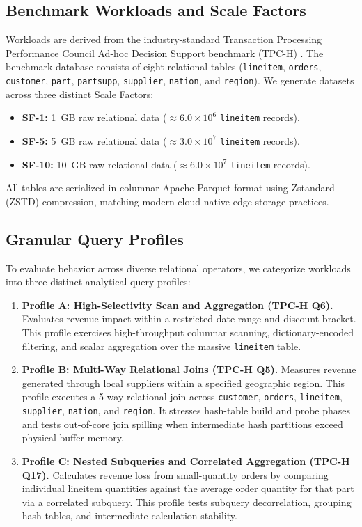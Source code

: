 \subsection{Benchmark Workloads and Scale Factors}
Workloads are derived from the industry-standard Transaction Processing Performance Council Ad-hoc Decision Support benchmark (TPC-H) \cite{tpch2021}. The benchmark database consists of eight relational tables (\texttt{lineitem}, \texttt{orders}, \texttt{customer}, \texttt{part}, \texttt{partsupp}, \texttt{supplier}, \texttt{nation}, and \texttt{region}). We generate datasets across three distinct Scale Factors:
\begin{itemize}
    \item \textbf{SF-1:} 1~GB raw relational data ($\approx 6.0 \times 10^6$ \texttt{lineitem} records).
    \item \textbf{SF-5:} 5~GB raw relational data ($\approx 3.0 \times 10^7$ \texttt{lineitem} records).
    \item \textbf{SF-10:} 10~GB raw relational data ($\approx 6.0 \times 10^7$ \texttt{lineitem} records).
\end{itemize}
All tables are serialized in columnar Apache Parquet format \cite{parquet2024} using Zstandard (ZSTD) compression, matching modern cloud-native edge storage practices.

\subsection{Granular Query Profiles}
To evaluate behavior across diverse relational operators, we categorize workloads into three distinct analytical query profiles:
\begin{enumerate}
    \item \textbf{Profile A: High-Selectivity Scan and Aggregation (TPC-H Q6).} 
    Evaluates revenue impact within a restricted date range and discount bracket. This profile exercises high-throughput columnar scanning, dictionary-encoded filtering, and scalar aggregation over the massive \texttt{lineitem} table.
    \item \textbf{Profile B: Multi-Way Relational Joins (TPC-H Q5).} 
    Measures revenue generated through local suppliers within a specified geographic region. This profile executes a 5-way relational join across \texttt{customer}, \texttt{orders}, \texttt{lineitem}, \texttt{supplier}, \texttt{nation}, and \texttt{region}. It stresses hash-table build and probe phases and tests out-of-core join spilling when intermediate hash partitions exceed physical buffer memory.
    \item \textbf{Profile C: Nested Subqueries and Correlated Aggregation (TPC-H Q17).} 
    Calculates revenue loss from small-quantity orders by comparing individual lineitem quantities against the average order quantity for that part via a correlated subquery. This profile tests subquery decorrelation, grouping hash tables, and intermediate calculation stability.
\end{enumerate}

